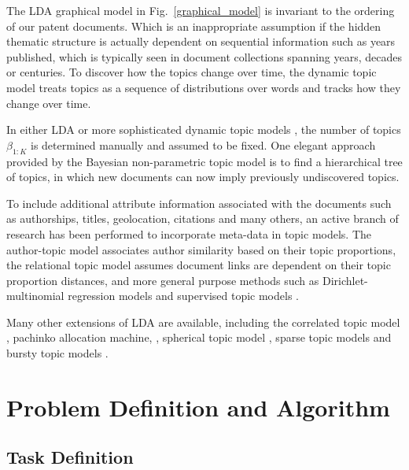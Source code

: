 \documentclass[conference]{IEEEtran}
\begin{document}
The LDA graphical model in Fig.~\ref{graphical_model} is invariant to the ordering of our patent documents. Which is an inappropriate assumption if the hidden thematic structure is actually dependent on sequential information such as years published, which is typically seen in document collections spanning years, decades or centuries. To discover how the topics change over time, the dynamic topic model \cite{blei2006} treats topics as a sequence of distributions over words and tracks how they change over time.

In either LDA or more sophisticated dynamic topic models \cite{blei2006}, the number of topics $\beta_{1:K}$ is determined manually and assumed to be fixed. One elegant approach provided by the Bayesian non-parametric topic model \cite{teh2006} is to find a hierarchical tree of topics, in which new documents can now imply previously undiscovered topics.

To include additional attribute information associated with the documents such as authorships, titles, geolocation, citations and many others, an active branch of research has been performed to incorporate meta-data in topic models. The author-topic model \cite{rosen-zvi2004} associates author similarity based on their topic proportions, the relational topic model \cite{blei2010} assumes document links are dependent on their topic proportion distances, and more general purpose methods such as Dirichlet-multinomial regression models \cite{mimno2008} and supervised topic models \cite{blei2007}.

Many other extensions of LDA are available, including the correlated topic model \cite{blei2007a}, pachinko allocation machine,  \cite{li2006}, spherical topic model \cite{reisinger2010}, sparse topic models \cite{wang2009} and bursty topic models \cite{doyle2009}.



\section{Problem Definition and Algorithm}


\subsection{Task Definition}
\end{document}
